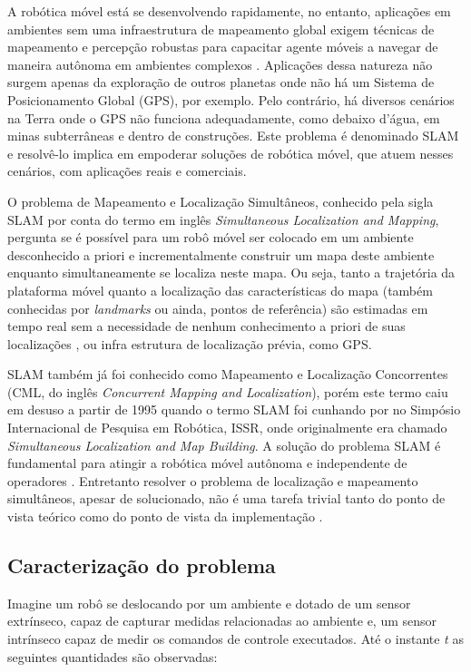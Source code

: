 
A robótica móvel está se desenvolvendo rapidamente, no entanto, aplicações 
em ambientes sem uma infraestrutura de mapeamento global exigem técnicas 
de mapeamento e percepção robustas para capacitar agente móveis a 
navegar de maneira autônoma em ambientes complexos \cite{saeedi2016multiple}. Aplicações dessa 
natureza não surgem apenas da exploração de outros planetas onde não há 
um Sistema de Posicionamento Global (GPS), por exemplo. Pelo contrário, há diversos cenários na Terra onde o 
GPS não funciona adequadamente, como debaixo d'água, 
em minas subterrâneas e dentro de construções. Este problema é denominado SLAM e resolvê-lo implica em empoderar soluções de robótica móvel, 
que atuem nesses cenários, com aplicações reais e comerciais.

O problema de Mapeamento e Localização Simultâneos, conhecido pela sigla SLAM por conta do termo em inglês \textit{Simultaneous Localization and Mapping}, pergunta se é possível para um robô móvel ser colocado em um ambiente desconhecido a priori e incrementalmente construir um mapa deste ambiente enquanto simultaneamente se localiza neste mapa. Ou seja, tanto a trajetória da plataforma móvel quanto a localização das características do mapa (também conhecidas por \textit{landmarks} ou ainda, pontos de referência) são estimadas em tempo real sem a necessidade de nenhum conhecimento a priori de suas localizações \cite{durrant2006simultaneous}, ou infra estrutura de localização prévia, como GPS.

SLAM também já foi conhecido como Mapeamento e Localização Concorrentes (CML, do inglês \textit{Concurrent Mapping and Localization}), porém este termo caiu em desuso a partir de 1995 quando o termo SLAM foi cunhando por  no Simpósio Internacional de Pesquisa em Robótica, ISSR, onde originalmente era chamado \textit{Simultaneous Localization and Map Building}. A solução do problema SLAM é fundamental para atingir a robótica móvel autônoma e independente de operadores \cite{durrant2006simultaneous}. Entretanto resolver o problema de localização e mapeamento simultâneos, apesar de solucionado, não é uma tarefa trivial tanto do ponto de vista teórico como do ponto de vista da implementação \cite{durrant1996localization}.

\subsection*{Caracterização do problema}
Imagine um robô se deslocando por um ambiente e dotado de um sensor extrínseco, capaz de capturar medidas relacionadas ao 
ambiente e, um sensor intrínseco capaz de medir os comandos de 
controle executados. Até o instante \emph{t} as seguintes 
quantidades são observadas:

